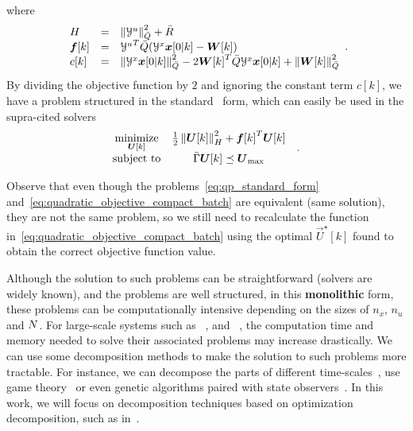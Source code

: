 \documentclass[../main.tex]{subfiles}
\begin{document}
where
\begin{equation}
\begin{array}{lll}
H&=&\left\lVert\mathcal{Y}^{u}\right\rVert^{2}_{\bar{Q}}+\bar{R}\\
\boldsymbol{f}[k]&=&{\mathcal{Y}^{u}}^{T}\bar{Q}(\mathcal{Y}^{x}\boldsymbol{x}[0|k]-\boldsymbol{W}[k])\\
c[k]&=&\left\lVert\mathcal{Y}^{x}\boldsymbol{x}[0|k]\right\rVert^{2}_{\bar{Q}}-2{\boldsymbol{W}[k]}^{T}\bar{Q}{\mathcal{Y}^{x}}\boldsymbol{x}[0|k]+\left\lVert\boldsymbol{W}[k]\right\rVert^{2}_{\bar{Q}}
\end{array}.
\end{equation}
By dividing the objective function by $2$ and ignoring the constant term $c[k]$, we have a problem structured in the standard \qp\ form, which can easily be used in the supra-cited solvers
\begin{equation}
  \label{eq:qp_standard_form}
  \begin{aligned}
    \begin{matrix}
      \mathop{\textrm{minimize}}\limits_{\boldsymbol{U}[k]} &
      \frac{1}{2}\left\lVert\boldsymbol{U}[k]\right\rVert^{2}_{H} + {\boldsymbol{f}[k]}^{T}\boldsymbol{U}[k] &\\
      \mathrm{subject~ to} &
\bar{\Gamma}\boldsymbol{U}[k]\preceq {\boldsymbol{U}}_{\text{max}}
    \end{matrix}
  \end{aligned}.
\end{equation}

\begin{remark}\label{rem:equivalence_problems_not_same_objective}
  Observe that even though the problems~\eqref{eq:qp_standard_form} and~\eqref{eq:quadratic_objective_compact_batch} are equivalent (same solution), they are not the same problem, so we still need to recalculate the function in~\eqref{eq:quadratic_objective_compact_batch} using the optimal $\vec{U}^{\star}[k]$ found to obtain the correct objective function value.
\end{remark}

Although the solution to such problems can be straightforward (solvers are widely known), and the problems are well structured, in this \textbf{monolithic} form, these problems can be computationally intensive depending on the sizes of $n_{x}$, $n_{u}$ and $N$.
For large-scale systems such as \wdns~\cite{ZhangEtAl2021}, and \dhns~\cite{TaylorEtAl2021}, the computation time and memory needed to solve their associated problems may increase drastically.
We can use some decomposition methods to make the solution to such problems more tractable.
For instance, we can decompose the parts of different time-scales~\cite{ChenEtAl2011}, use game theory~\cite{MaestreEtAl2011} or even genetic algorithms paired with state observers~\cite{XieEtAl2016}.
In this work, we will focus on decomposition techniques based on optimization decomposition, such as in~\cite{GiselssonEtAl2013}.
\end{document}
